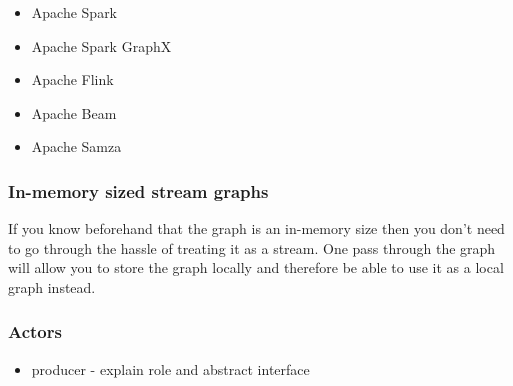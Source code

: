 \begin{itemize}
    \item
          Apache Spark
    \item
          Apache Spark GraphX
    \item
          Apache Flink
    \item
          Apache Beam
    \item
          Apache Samza
\end{itemize}

\subsubsection{In-memory sized stream graphs}

If you know beforehand that the graph is an in-memory size then you don't need
to go through the hassle of treating it as a stream. One pass through the graph
will allow you to store the graph locally and therefore be able to use it as a
local graph instead.

\subsubsection{Actors}


\begin{itemize}
    \item
          producer - explain role and abstract interface
\end{itemize}
